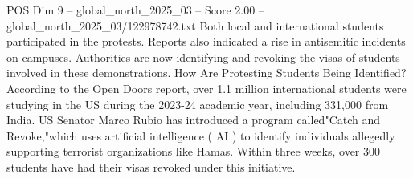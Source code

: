 \begin{textsample}{POS Dim 9 – global\_north\_2025\_03 – Score 2.00 – global\_north\_2025\_03/122978742.txt}
Both local and international students participated in the protests.
Reports also indicated a rise in antisemitic incidents on campuses.
Authorities are now identifying and revoking the visas of students involved in these demonstrations.
How Are Protesting Students Being Identified?
According to the Open Doors report, over 1.1 million international students were studying in the US during the 2023-24 academic year, including 331,000 from India.
US Senator Marco Rubio has introduced a program called"Catch and Revoke,"which uses artificial intelligence ( AI ) to identify individuals allegedly supporting terrorist organizations like Hamas.
Within three weeks, over 300 students have had their visas revoked under this initiative.

\end{textsample}
